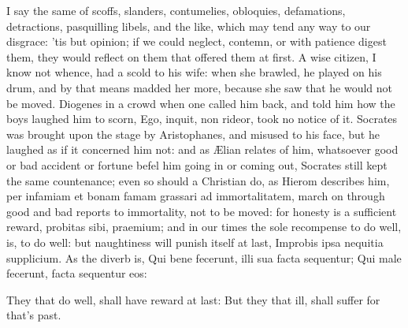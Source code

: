 {I say the same of scoffs, slanders, contumelies, obloquies,
defamations, detractions, pasquilling libels, and the like, which may
tend any way to our disgrace: 'tis but opinion; if we could neglect,
contemn, or with patience digest them, they would reflect on them that
offered them at first. A wise citizen, I know not whence, had a scold
to his wife: when she brawled, he played on his drum, and by that means
madded her more, because she saw that he would not be moved. Diogenes
in a crowd when one called him back, and told him how the boys laughed
him to scorn, Ego, inquit, non rideor, took no notice of it. Socrates
was brought upon the stage by Aristophanes, and misused to his face,
but he laughed as if it concerned him not: and as \AE{}lian relates of
him, whatsoever good or bad accident or fortune befel him going in or
coming out, Socrates still kept the same countenance; even so should a
Christian do, as Hierom describes him, per infamiam et bonam famam
grassari ad immortalitatem, march on through good and bad reports to
immortality, not to be moved: for honesty is a sufficient reward,
probitas sibi, praemium; and in our times the sole recompense to do
well, is, to do well: but naughtiness will punish itself at last,
Improbis ipsa nequitia supplicium. As the diverb is,
Qui bene fecerunt, illi sua facta sequentur;
Qui male fecerunt, facta sequentur eos:

They that do well, shall have reward at last:
But they that ill, shall suffer for that's past.

}
